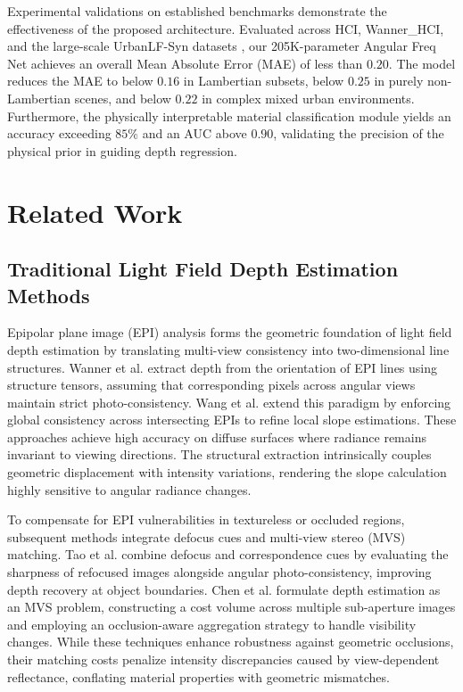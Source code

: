 \documentclass[lettersize,journal]{IEEEtran}
\begin{document}
Experimental validations on established benchmarks demonstrate the effectiveness of the proposed architecture. Evaluated across HCI, Wanner\_HCI, and the large-scale UrbanLF-Syn datasets \cite{honauer2016}, our 205K-parameter Angular Freq Net achieves an overall Mean Absolute Error (MAE) of less than $0.20$. The model reduces the MAE to below $0.16$ in Lambertian subsets, below $0.25$ in purely non-Lambertian scenes, and below $0.22$ in complex mixed urban environments. Furthermore, the physically interpretable material classification module yields an accuracy exceeding $85\%$ and an AUC above $0.90$, validating the precision of the physical prior in guiding depth regression.

\section{Related Work}

\subsection{Traditional Light Field Depth Estimation Methods}

Epipolar plane image (EPI) analysis forms the geometric foundation of light field depth estimation by translating multi-view consistency into two-dimensional line structures. Wanner et al. \cite{wanner2014} extract depth from the orientation of EPI lines using structure tensors, assuming that corresponding pixels across angular views maintain strict photo-consistency. Wang et al. \cite{wang2015} extend this paradigm by enforcing global consistency across intersecting EPIs to refine local slope estimations. These approaches achieve high accuracy on diffuse surfaces where radiance remains invariant to viewing directions. The structural extraction intrinsically couples geometric displacement with intensity variations, rendering the slope calculation highly sensitive to angular radiance changes.

To compensate for EPI vulnerabilities in textureless or occluded regions, subsequent methods integrate defocus cues and multi-view stereo (MVS) matching. Tao et al. \cite{tao2013} combine defocus and correspondence cues by evaluating the sharpness of refocused images alongside angular photo-consistency, improving depth recovery at object boundaries. Chen et al. \cite{chen2017} formulate depth estimation as an MVS problem, constructing a cost volume across multiple sub-aperture images and employing an occlusion-aware aggregation strategy to handle visibility changes. While these techniques enhance robustness against geometric occlusions, their matching costs penalize intensity discrepancies caused by view-dependent reflectance, conflating material properties with geometric mismatches.
\end{document}
